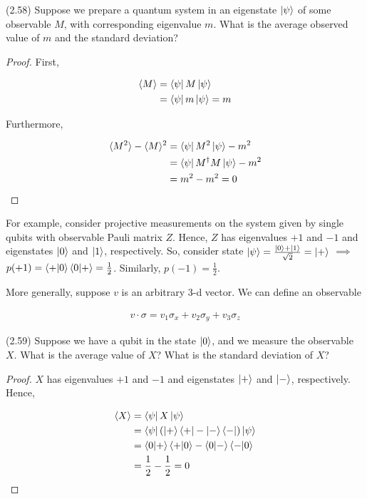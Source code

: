 \documentclass[main.tex]{subfiles}
\begin{document}
\begin{subappendices}
\begin{exercise}
	(2.58) Suppose we prepare a quantum system in an eigenstate $\ket{\psi}$ of some observable $M$, with corresponding eigenvalue $m$. What is the average observed value of $m$ and the standard deviation?
	
	\begin{proof}
		First, 
		
		\begin{align*}
	\langle M \rangle &= \bra{\psi} M 	\ket{\psi} \\
	&= \bra{\psi} m \ket{\psi} = m
	\end{align*}
	
	Furthermore,

	\begin{align*}
	\langle M^2 \rangle - \langle M \rangle^2 &= \bra{\psi} M^2 	\ket{\psi} - m^2 \\
	&= \bra{\psi} M^\dag M \ket{\psi} -m^2 \\
	&= m^2 - m^2 = 0
	\end{align*}
	\end{proof}	
	
\end{exercise} 

For example, consider projective measurements on the system given by single qubits with observable Pauli matrix $Z$. Hence, $Z$ has eigenvalues $+1$ and $-1$ and eigenstates $\ket{0}$ and $\ket{1}$, respectively. So, consider state $\ket{\psi} = \frac{\ket{0} + \ket{1}}{\sqrt{2}}= \ket{+}$ $\implies$ $p(+1) = \bra{+}\ket{0}\bra{0}\ket{+} = \frac{1}{2}$. Similarly, $p(-1) = \frac{1}{2}$. 

More generally, suppose $v$ is an arbitrary 3-d vector. We can define an observable

\begin{align*}
v \cdot \sigma = v_1\sigma_x + v_2 \sigma_y + v_3\sigma_z
\end{align*}

\begin{exercise}
	(2.59) Suppose we have a qubit in the state $\ket{0}$, and we measure the observable $X$. What is the average value of $X$? What is the standard deviation of $X$?
	
	\begin{proof}
		$X$ has eigenvalues $+1$ and $-1$ and eigenstates $\ket{+}$ and $\ket{-}$, respectively. Hence,
		
	\begin{align*}
	\langle X \rangle &= \bra{\psi} X 	\ket{\psi} \\
	&= \bra{\psi} (\ket{+}\bra{+} - \ket{-}\bra{-}) \ket{\psi} \\
	&= \bra{0}\ket{+}\bra{+}\ket{0} - \bra{0}\ket{-}\bra{-}\ket{0}\\
	&= \frac{1}{2} - \frac{1}{2} = 0
	\end{align*}
	

\end{proof}
\end{exercise}
\end{subappendices}
\end{document}
